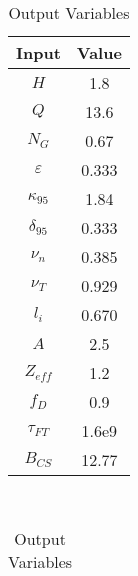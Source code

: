 \begin{table}[b!]
\centering
\caption{ARC Variables}
\hfill
\begin{subtable}[t]{0.4\textwidth}
\centering
\caption{Input Variables} ~\\
\begin{tabular}{ c|c }

Input            & Value           \\
\hline
$H$              & 1.8             \\
$Q$              & 13.6            \\
$N_{G}$          & 0.67            \\
$\varepsilon$       & 0.333          \\
$\kappa_{95}$    & 1.84            \\
$\delta_{95}$    & 0.333           \\
$\nu_{n}$        & 0.385           \\
$\nu_{T}$        & 0.929           \\
$l_{i}$          & 0.670            \\
$A$              & 2.5             \\
$Z_{eff}$        & 1.2             \\
$f_{D}$          & 0.9             \\
$\tau_{FT}$      & 1.6e9           \\
$B_{CS}$         & 12.77           \\

\end{tabular}
\end{subtable}
\hfill
\begin{subtable}[t]{0.5\textwidth}
\centering
\caption{Output Variables} ~\\
\begin{tabular}{ c|c|c }


\end{tabular}
\end{subtable}
\end{table}
